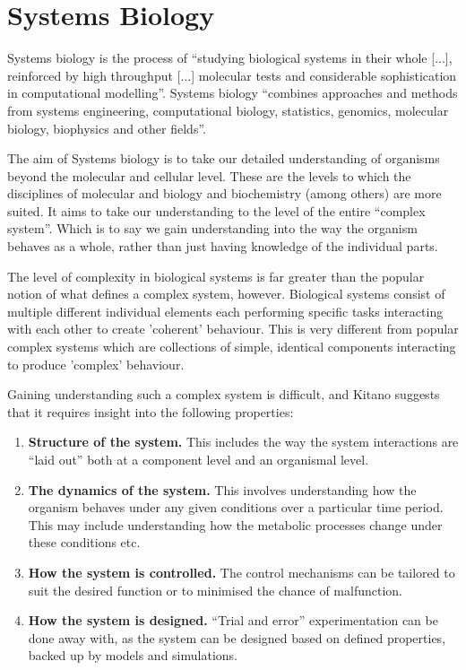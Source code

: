 \section{Systems Biology}
Systems biology is the process of ``studying biological systems in their whole [...], reinforced by high throughput [...] molecular tests and considerable sophistication in computational modelling''\cite{Kahlem2006}. Systems biology ``combines approaches and methods from systems engineering, computational biology, statistics, genomics, molecular biology, biophysics and other fields''\cite{Doyle2006}.

The aim of Systems biology is to take our detailed understanding of organisms beyond the molecular and cellular level. These are the levels to which the disciplines of molecular and biology and biochemistry (among others) are more suited. It aims to take our understanding to the level of the entire ``complex system''. Which is to say we gain understanding into the way the organism behaves as a whole, rather than just having knowledge of the individual parts.

The level of complexity in biological systems is far greater than the popular notion of what defines a complex system, however. Biological systems consist of multiple different individual elements each performing specific tasks interacting with each other to create 'coherent' behaviour. This is very different from popular complex systems which are collections of simple, identical components interacting to produce 'complex' behaviour\cite{Kitano2002}.

Gaining understanding such a complex system is difficult, and Kitano suggests that it requires insight into the following properties\cite{Kitano2002a}:
\begin{enumerate}
 \item {\bf Structure of the system.} This includes the way the system interactions are ``laid out'' both at a component level and an organismal level.
 \item {\bf The dynamics of the system.} This involves understanding how the organism behaves under any given conditions over a particular time period. This may include understanding how the metabolic processes change under these conditions etc.
 \item {\bf How the system is controlled.} The control mechanisms can be tailored to suit the desired function or to minimised the chance of malfunction.
 \item {\bf How the system is designed.} ``Trial and error'' experimentation can be done away with, as the system can be designed based on defined properties, backed up by models and simulations.
\end{enumerate}


